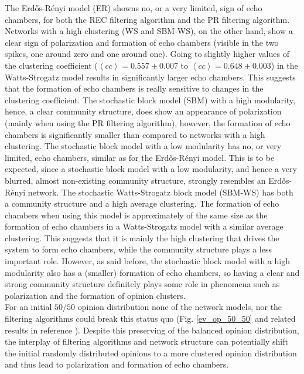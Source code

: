 \documentclass[11 pt , letterpaper , twoside , openright]{book}
\begin{document}
The Erd\H{o}s-R\'{e}nyi model (ER) showns no, or a very limited, sign of echo chambers, for both the REC filtering algorithm and the PR filtering algorithm. Networks with a high clustering (WS and SBM-WS), on the other hand, show a clear sign of polarization and formation of echo chambers (visible in the two spikes, one around zero and one around one). Going to slightly higher values of the clustering coefficient ($\left<cc\right> = 0.557 \pm 0.007$ to $\left<cc\right> = 0.648 \pm 0.003$) in the Watts-Strogatz model results in significantly larger echo chambers. This suggests that the formation of echo chambers is really sensitive to changes in the clustering coefficient. The stochastic block model (SBM) with a high modularity, hence, a clear community structure, does show an appearance of polarization (mainly when using the PR filtering algorithm), however, the formation of echo chambers is significantly smaller than compared to networks with a high clustering. The stochastic block model with a low modularity has no, or very limited, echo chambers, similar as for the Erd\H{o}s-R\'{e}nyi   
model. This is to be expected, since a stochastic block model with a low modularity, and hence a very blurred, almost non-existing community structure, strongly resembles an Erd\H{o}s-R\'{e}nyi network. The stochastic Watts-Strogatz block model (SBM-WS) has both a community structure and a high average clustering. The formation of echo chambers when using this model is approximately of the same size as the formation of echo chambers in a Watts-Strogatz model with a similar average clustering. This suggests that it is mainly the high clustering that drives the system to form echo chambers, while the community structure plays a less important role. However, as said before, the stochastic block model with a high modularity also has a (smaller) formation of echo chambers, so having a clear and strong community structure definitely plays some role in phenomena such as polarization and the formation of opinion clusters. \\
\newline
For an initial $50/50$ opinion distribution none of the network models, nor the filtering algorithms could break this status quo (Fig. \ref{ev_op_50_50} and related results in reference \cite{Perra2019}). Despite this preserving of the balanced opinion distribution, the interplay of filtering algorithms and network structure can potentially shift the initial randomly distributed opinions to a more clustered opinion distribution and thus lead to polarization and formation of echo chambers.
\end{document}
